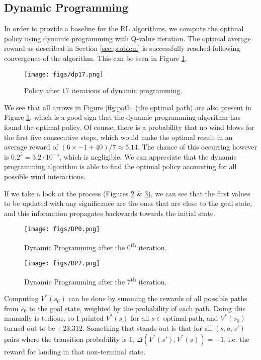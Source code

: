 \documentclass{article}
\begin{document}
\subsection{Dynamic Programming}
\label{ssec:resdp}

In order to provide a baseline for the RL algorithms, we compute the optimal policy using dynamic programming with Q-value iteration.
The optimal average reward as described in Section \ref{sec:problem} is successfully reached following convergence of the algorithm.
This can be seen in Figure \ref{fig:dp17}.

\begin{figure}[htbp]
    \centering
    \texttt{[image: figs/dp17.png]}
    \caption{Policy after $17$ iterations of dynamic programming.}
    \label{fig:dp17}
\end{figure}

We see that all arrows in Figure \ref{fig:path} (the optimal path) are also present in Figure \ref{fig:dp17}, which is a good sign that the dynamic programming algorithm has found the optimal policy.
Of course, there is a probability that no wind blows for the first five consecutive steps, which would make the optimal result in an average reward of $(6 \times -1 + 40) / 7 \approx 5.14$.
The chance of this occurring however is $0.2^5 = 3.2 \cdot 10^{-4}$, which is negligible.
We can appreciate that the dynamic programming algorithm is able to find the optimal policy accounting for all possible wind interactions.

If we take a look at the process (Figures \ref{fig:dp0} \& \ref{fig:dp7}), we can see that the first values to be updated with any significance are the ones that are close to the goal state, and this information propagates backwards towards the initial state.

\begin{figure}[htbp]
    \centering
    \texttt{[image: figs/DP0.png]}
    \caption{Dynamic Programming after the $0$\textsuperscript{th} iteration.}
    \label{fig:dp0}
\end{figure}

\begin{figure}[htbp]
    \centering
    \texttt{[image: figs/DP7.png]}
    \caption{Dynamic Programming after the $7$\textsuperscript{th} iteration.}
    \label{fig:dp7}
\end{figure}

Computing $V^*(s_0)$ can be done by summing the rewards of all possible paths from $s_0$ to the goal state, weighted by the probability of each path.
Doing this manually is tedious, so I printed $V^*(s)$ for all $s \in \mathrm{optimal\ path}$, and $V^*(s_0)$ turned out to be $\pm 23.312$.
Something that stands out is that for all $(s, a, s')$ pairs where the transition probability is $1$, $\Delta(V^*(s'), V^*(s)) = -1$, i.e. the reward for landing in that non-terminal state.
\end{document}

